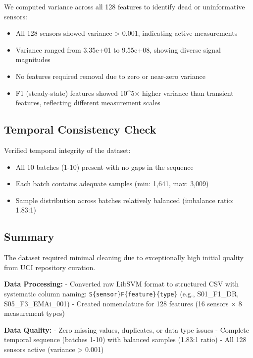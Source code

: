 \documentclass[
  letterpaper,
  DIV=11,
  numbers=noendperiod]{scrartcl}
\providecommand{\tightlist}{%
  \setlength{\itemsep}{0pt}\setlength{\parskip}{0pt}}
\begin{document}
We computed variance across all 128 features to identify dead or
uninformative sensors:

\begin{itemize}
\tightlist
\item
  All 128 sensors showed variance \textgreater{} 0.001, indicating
  active measurements
\item
  Variance ranged from 3.35e+01 to 9.55e+08, showing diverse signal
  magnitudes
\item
  No features required removal due to zero or near-zero variance
\item
  F1 (steady-state) features showed 10\^{}5× higher variance than
  transient features, reflecting different measurement scales
\end{itemize}

\subsection{Temporal Consistency
Check}\label{temporal-consistency-check}

Verified temporal integrity of the dataset:

\begin{itemize}
\tightlist
\item
  All 10 batches (1-10) present with no gaps in the sequence
\item
  Each batch contains adequate samples (min: 1,641, max: 3,009)
\item
  Sample distribution across batches relatively balanced (imbalance
  ratio: 1.83:1)
\end{itemize}

\subsection{Summary}\label{summary}

The dataset required minimal cleaning due to exceptionally high initial
quality from UCI repository curation.

\textbf{Data Processing:} - Converted raw LibSVM format to structured
CSV with systematic column naming:
\texttt{S\{sensor\}F\{feature\}\{type\}} (e.g., S01\_F1\_DR,
S05\_F3\_EMAi\_001) - Created nomenclature for 128 features (16 sensors
× 8 measurement types)

\textbf{Data Quality:} - Zero missing values, duplicates, or data type
issues - Complete temporal sequence (batches 1-10) with balanced samples
(1.83:1 ratio) - All 128 sensors active (variance \textgreater{} 0.001)
\end{document}
